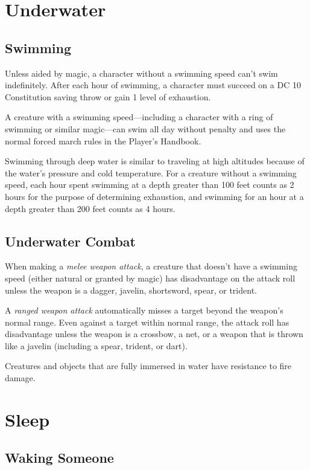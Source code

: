 \documentclass[a4paper,10pt,twoside,twocolumn,openany,bg=none,nodeprecatedcode]{dndarticle}
\begin{document}
\section{Underwater}

\subsection{Swimming}

Unless aided by magic, a character without a swimming speed can't swim indefinitely. After each hour of swimming, a character must succeed on a DC 10 Constitution saving throw or gain 1 level of exhaustion.

A creature with a swimming speed---including a character with a ring of swimming or similar magic---can swim all day without penalty and uses the normal forced march rules in the Player's Handbook.

Swimming through deep water is similar to traveling at high altitudes because of the water's pressure and cold temperature. For a creature without a swimming speed, each hour spent swimming at a depth greater than 100 feet counts as 2 hours for the purpose of determining exhaustion, and swimming for an hour at a depth greater than 200 feet counts as 4 hours.

\subsection{Underwater Combat}

When making a \emph{melee weapon attack}, a creature that doesn't have a swimming speed (either natural or granted by magic) has disadvantage on the attack roll unless the weapon is a dagger, javelin, shortsword, spear, or trident.

A \emph{ranged weapon attack} automatically misses a target beyond the weapon's normal range. Even against a target within normal range, the attack roll has disadvantage unless the weapon is a crossbow, a net, or a weapon that is thrown like a javelin (including a spear, trident, or dart).

Creatures and objects that are fully immersed in water have resistance to fire damage.

\section{Sleep}

\subsection{Waking Someone}
\end{document}
